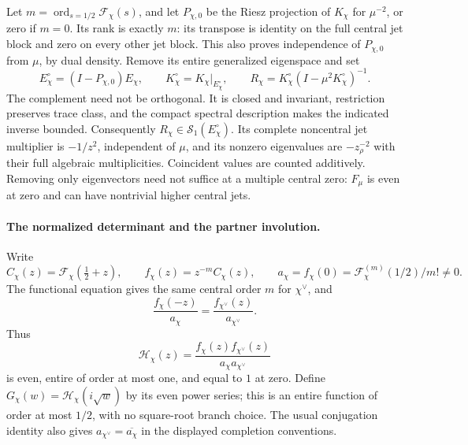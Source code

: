 \documentclass[11pt,a4paper]{article}
\begin{document}
Let $m=\operatorname{ord}_{s=1/2}\mathcal F_\chi(s)$, and let $P_{\chi,0}$ be the Riesz projection of $K_\chi$ for $\mu^{-2}$, or zero if $m=0$. Its rank is exactly $m$: its transpose is identity on the full central jet block and zero on every other jet block. This also proves independence of $P_{\chi,0}$ from $\mu$, by dual density. Remove its entire generalized eigenspace and set
\[
 E_\chi^\circ=(I-P_{\chi,0})E_\chi,\qquad
 K_\chi^\circ=K_\chi|_{E_\chi^\circ},\qquad
 R_\chi=K_\chi^\circ(I-\mu^2K_\chi^\circ)^{-1}.
\]
The complement need not be orthogonal. It is closed and invariant, restriction preserves trace class, and the compact spectral description makes the indicated inverse bounded. Consequently $R_\chi\in\mathcal S_1(E_\chi^\circ)$. Its complete noncentral jet multiplier is $-1/z^2$, independent of $\mu$, and its nonzero eigenvalues are $-z_\rho^{-2}$ with their full algebraic multiplicities. Coincident values are counted additively. Removing only eigenvectors need not suffice at a multiple central zero: $F_\mu$ is even at zero and can have nontrivial higher central jets.

\paragraph{The normalized determinant and the partner involution.}
Write
\[
 C_\chi(z)=\mathcal F_\chi(\tfrac12+z),\qquad
 f_\chi(z)=z^{-m}C_\chi(z),\qquad
 a_\chi=f_\chi(0)=\mathcal F_\chi^{(m)}(1/2)/m!\ne0.
\]
The functional equation gives the same central order $m$ for $\chi^\vee$, and
\[
 \frac{f_\chi(-z)}{a_\chi}
 =\frac{f_{\chi^\vee}(z)}{a_{\chi^\vee}}.
\]
Thus
\[
 \mathcal H_\chi(z)=
 \frac{f_\chi(z)f_{\chi^\vee}(z)}{a_\chi a_{\chi^\vee}}
\]
is even, entire of order at most one, and equal to $1$ at zero. Define $G_\chi(w)=\mathcal H_\chi(i\sqrt w)$ by its even power series; this is an entire function of order at most $1/2$, with no square-root branch choice. The usual conjugation identity also gives $a_{\chi^\vee}=\overline{a_\chi}$ in the displayed completion conventions.
\end{document}

